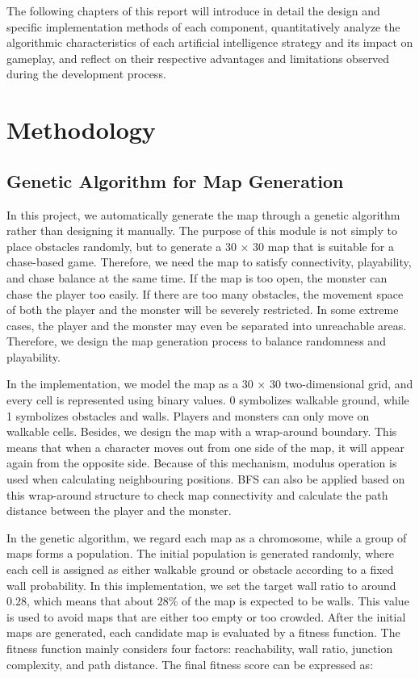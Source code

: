 \documentclass[12pt,a4paper]{article}
\begin{document}
The following chapters of this report will introduce in detail the design and specific implementation methods of each component, quantitatively analyze the algorithmic characteristics of each artificial intelligence strategy and its impact on gameplay, and reflect on their respective advantages and limitations observed during the development process.

\section{Methodology}

\subsection{Genetic Algorithm for Map Generation}

In this project, we automatically generate the map through a genetic algorithm rather than designing it manually. The purpose of this module is not simply to place obstacles randomly, but to generate a 30 × 30 map that is suitable for a chase-based game. Therefore, we need the map to satisfy connectivity, playability, and chase balance at the same time. If the map is too open, the monster can chase the player too easily. If there are too many obstacles, the movement space of both the player and the monster will be severely restricted. In some extreme cases, the player and the monster may even be separated into unreachable areas. Therefore, we design the map generation process to balance randomness and playability.

In the implementation, we model the map as a 30 × 30 two-dimensional grid, and every cell is represented using binary values. 0 symbolizes walkable ground, while 1 symbolizes obstacles and walls. Players and monsters can only move on walkable cells. Besides, we design the map with a wrap-around boundary. This means that when a character moves out from one side of the map, it will appear again from the opposite side. Because of this mechanism, modulus operation is used when calculating neighbouring positions. BFS can also be applied based on this wrap-around structure to check map connectivity and calculate the path distance between the player and the monster.

In the genetic algorithm, we regard each map as a chromosome, while a group of maps forms a population. The initial population is generated randomly, where each cell is assigned as either walkable ground or obstacle according to a fixed wall probability. In this implementation, we set the target wall ratio to around $0.28$, which means that about $28\%$ of the map is expected to be walls. This value is used to avoid maps that are either too empty or too crowded.
After the initial maps are generated, each candidate map is evaluated by a fitness function. The fitness function mainly considers four factors: reachability, wall ratio, junction complexity, and path distance. The final fitness score can be expressed as:
\end{document}
